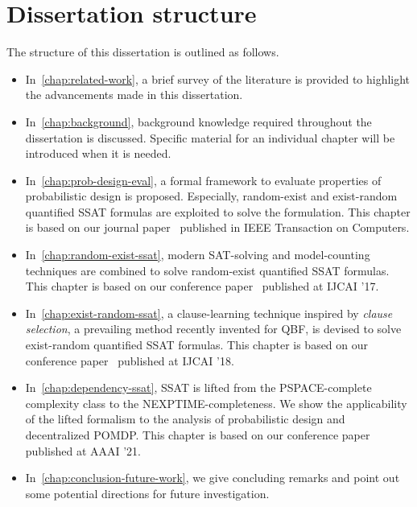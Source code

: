 \section{Dissertation structure}
The structure of this dissertation is outlined as follows.
\begin{itemize}
    \item
          In~\cref{chap:related-work}, a brief survey of the literature is provided to highlight the advancements made in this dissertation.
    \item
          In~\cref{chap:background}, background knowledge required throughout the dissertation is discussed.
          Specific material for an individual chapter will be introduced when it is needed.
    \item
          In~\cref{chap:prob-design-eval}, a formal framework to evaluate properties of probabilistic design is proposed.
          Especially, random-exist and exist-random quantified SSAT formulas are exploited to solve the formulation.
          This chapter is based on our journal paper~\cite{LeeTC18ProbDesign} published in IEEE Transaction on Computers.
    \item
          In~\cref{chap:random-exist-ssat}, modern SAT-solving and model-counting techniques are combined to solve random-exist quantified SSAT formulas.
          This chapter is based on our conference paper~\cite{LeeIJCAI17RESSAT} published at IJCAI '17.
    \item
          In~\cref{chap:exist-random-ssat}, a clause-learning technique inspired by \textit{clause selection}, a prevailing method recently invented for QBF, is devised to solve exist-random quantified SSAT formulas.
          This chapter is based on our conference paper~\cite{LeeIJCAI18ERSSAT} published at IJCAI '18.
    \item
          In~\cref{chap:dependency-ssat}, SSAT is lifted from the PSPACE-complete complexity class to the NEXPTIME-completeness.
          We show the applicability of the lifted formalism to the analysis of probabilistic design and decentralized POMDP.
          This chapter is based on our conference paper~\cite{LeeAAAI21DSSAT} published at AAAI '21.
    \item
          In~\cref{chap:conclusion-future-work}, we give concluding remarks and point out some potential directions for future investigation.
\end{itemize}